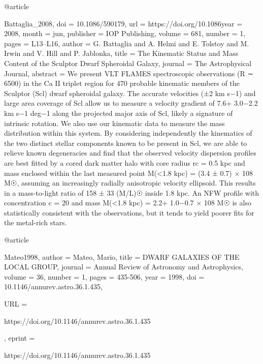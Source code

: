 \documentclass[apj]{emulateapj}
\begin{document}
{{{{{{{{{{{{{{{{@article{Battaglia_2008,
	doi = {10.1086/590179},
	url = {https://doi.org/10.1086year = 2008,
	month = {jun},
	publisher = {{IOP} Publishing},
	volume = {681},
	number = {1},
	pages = {L13--L16},
	author = {G. Battaglia and A. Helmi and E. Tolstoy and M. Irwin and V. Hill and P. Jablonka},
	title = {The Kinematic Status and Mass Content of the Sculptor Dwarf Spheroidal Galaxy},
	journal = {The Astrophysical Journal},
	abstract = {We present VLT FLAMES spectroscopic observations (R ∼ 6500) in the Ca  II triplet region for 470 probable kinematic members of the Sculptor (Scl) dwarf spheroidal galaxy. The accurate velocities (±2 km s−1) and large area coverage of Scl allow us to measure a velocity gradient of 7.6+ 3.0−2.2 km s−1 deg−1 along the projected major axis of Scl, likely a signature of intrinsic rotation. We also use our kinematic data to measure the mass distribution within this system. By considering independently the kinematics of the two distinct stellar components known to be present in Scl, we are able to relieve known degeneracies and find that the observed velocity dispersion profiles are best fitted by a cored dark matter halo with core radius rc = 0.5 kpc and mass enclosed within the last measured point M(<1.8 kpc) = (3.4 ± 0.7) × 108 M☉, assuming an increasingly radially anisotropic velocity ellipsoid. This results in a mass-to-light ratio of 158 ± 33 (M/L)☉ inside 1.8 kpc. An NFW profile with concentration c = 20 and mass M(<1.8 kpc) = 2.2+ 1.0−0.7 × 108 M☉ is also statistically consistent with the observations, but it tends to yield poorer fits for the metal-rich stars.}
}





@article{Mateo1998,
author = {Mateo, Mario},
title = {DWARF GALAXIES OF THE LOCAL GROUP},
journal = {Annual Review of Astronomy and Astrophysics},
volume = {36},
number = {1},
pages = {435-506},
year = {1998},
doi = {10.1146/annurev.astro.36.1.435},

URL = { 
        https://doi.org/10.1146/annurev.astro.36.1.435
    
},
eprint = { 
        https://doi.org/10.1146/annurev.astro.36.1.435
    
}}}}}}}}}}}}}}}}}}}
\end{document}
